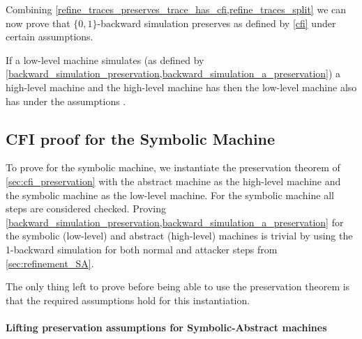 Combining
\cref{refine_traces_preserves_trace_has_cfi,refine_traces_split} we
can now prove that $\lbrace 0,1 \rbrace$-backward simulation preserves
\CFI as defined by \cref{cfi} under certain assumptions.

\begin{theorem}
\label{backward_refinement_preserves_cfi}
If a low-level machine simulates (as defined by
\cref{backward_simulation_preservation,backward_simulation_a_preservation})
a high-level machine and the high-level machine has \CFI then the
low-level machine also has \CFI under the assumptions
.
\end{theorem}

\subsection{CFI proof for the Symbolic Machine}
\label{sec:symbolic_proof}

To prove \CFI for the symbolic machine, we instantiate the
preservation theorem of \cref{sec:cfi_preservation} with the abstract
machine as the high-level machine and the symbolic machine as the
low-level machine. For the symbolic machine all steps are considered
checked. Proving
\cref{backward_simulation_preservation,backward_simulation_a_preservation}
for the symbolic (low-level) and abstract (high-level) machines is
trivial by using the 1-backward simulation for both normal and
attacker steps from \cref{sec:refinement_SA}.

The only thing left to prove before being able to use the \CFI
preservation theorem is that the required
assumptions 
hold for this instantiation.

\paragraph{Lifting preservation assumptions for Symbolic-Abstract machines}

